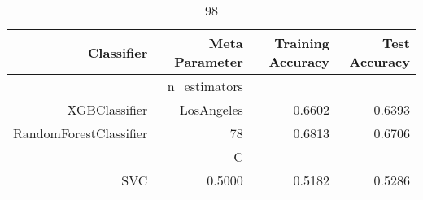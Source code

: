 
\begin{table}[H]
    \caption{98}
    \centering
    \begin{tabular}{|r|r|r|r|}
        \hline
        Classifier &Meta Parameter &Training Accuracy
        &Test Accuracy\\
        \hline
        &n\_estimators &\multicolumn{2}{|r|}{}\\
        \hline
        XGBClassifier &LosAngeles &0.6602 &0.6393\\
        \hline
        RandomForestClassifier &78 &0.6813 &0.6706\\
        \hline
        &C &\multicolumn{2}{|r|}{}\\
        \hline
        SVC &0.5000 &0.5182 &0.5286\\
        \hline
    \end{tabular}
\end{table}
